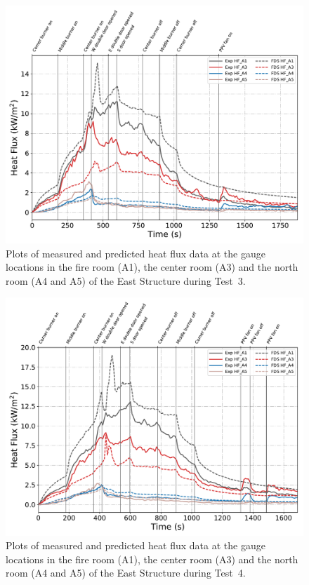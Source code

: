 \begin{figure}[!h]
	\centering
	\includegraphics[width=\columnwidth]{Figures/Plots/Validation/Heat_Flux/Test_3_HFs}
	\caption[Plots of measured and predicted heat flux data during Test~3.]{Plots of measured and predicted heat flux data at the gauge locations in the fire room (A1), the center room (A3) and the north room (A4 and A5) of the East Structure during Test~3.}
	\label{fig:Test3_HFs}
\end{figure}

\begin{figure}[!h]
	\centering
	\includegraphics[width=\columnwidth]{Figures/Plots/Validation/Heat_Flux/Test_4_HFs}
	\caption[Plots of measured and predicted heat flux data during Test~4.]{Plots of measured and predicted heat flux data at the gauge locations in the fire room (A1), the center room (A3) and the north room (A4 and A5) of the East Structure during Test~4.}
	\label{fig:Test4_HFs}
\end{figure}

